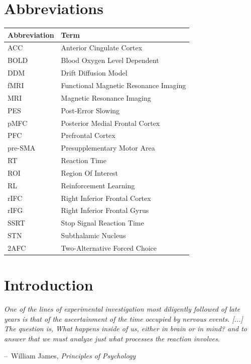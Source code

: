 \documentclass[12pt,openany]{book}
\title{}
\author{}
\date{}
\makeatletter
\newenvironment{chapquote}[2][2em]
  {\setlength{\@tempdima}{#1}%
   \def\chapquote@author{#2}%
   \parshape 1 \@tempdima \dimexpr\textwidth-2\@tempdima\relax%
   \itshape}
  {\par\normalfont\hfill--\ \chapquote@author\hspace*{\@tempdima}\par\bigskip}
\theoremstyle{definition}
\theoremstyle{definition}
\theoremstyle{definition}
\theoremstyle{remark}
\makeatother
\begin{document}
{
\setcounter{tocdepth}{1}
\tableofcontents
}
\cleardoublepage

\pagestyle{fancy} \fancyhf{} \renewcommand{\headrulewidth}{0pt}
\fancyfoot[LE,RO]{\thepage} \renewcommand{\floatpagefraction}{.9}

\setcounter{page}{9}

\chapter*{Abbreviations}\label{abbreviations}

\begin{tabular}{ll}
\toprule
Abbreviation & Term\\
\midrule
ACC & Anterior Cingulate Cortex\\
BOLD & Blood Oxygen Level Dependent\\
DDM & Drift Diffusion Model\\
fMRI & Functional Magnetic Resonance Imaging\\
MRI & Magnetic Resonance Imaging\\
PES & Post-Error Slowing\\
pMFC & Posterior Medial Frontal Cortex\\
PFC & Prefrontal Cortex\\
pre-SMA & Presupplementary Motor Area\\
RT & Reaction Time\\
ROI & Region Of Interest\\
RL & Reinforcement Learning\\
rIFC & Right Inferior Frontal Cortex\\
rIFG & Right Inferior Frontal Gyrus\\
SSRT & Stop Signal Reaction Time\\
STN & Subthalamic Nucleus\\
2AFC & Two-Alternative Forced Choice\\
\bottomrule
\end{tabular}

\chapter{Introduction}\label{introduction}

\begin{chapquote}{William James, \textit{Principles of Psychology}}
One of the lines of experimental investigation most diligently followed of late years is that of the ascertainment of the time occupied by nervous events. [...] The question is, What happens inside of us, either in brain or in mind? and to answer that we must analyze just what processes the reaction involves.
\end{chapquote}
\end{document}
